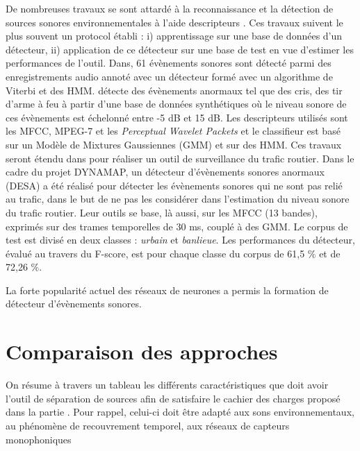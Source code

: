 De nombreuses travaux se sont attardé à la reconnaissance et la détection de sources sonores environnementales à l'aide descripteurs \cite{dufaux2000automatic,defreville_automatic_2006}. Ces travaux suivent le plus souvent un protocol établi : i) apprentissage sur une base de données d'un détecteur, ii) application de ce détecteur sur une base de test en vue d'estimer les performances de l'outil. Dans\cite{mesaros2010acoustic}, 61 évènements sonores sont détecté parmi des enregistrements audio annoté avec un détecteur formé avec un algorithme de Viterbi et des HMM. \cite{ntalampiras2011probabilistic} détecte des évènements anormaux tel que des cris, des tir d'arme à feu à partir d'une base de données synthétiques où le niveau sonore de ces évènements est échelonné entre -5 dB et 15 dB. Les descripteurs utilisés sont les MFCC, MPEG-7 et les \textit{Perceptual Wavelet Packets} et le classifieur est basé sur un Modèle de Mixtures Gaussiennes (GMM) et sur des HMM. Ces travaux seront étendu dans \cite{ntalampiras2014universal} pour réaliser un outil de surveillance du trafic routier. Dans le cadre du projet DYNAMAP, un détecteur d'évènements sonores anormaux (DESA) a été réalisé \cite{socoro2017anomalous} pour détecter les évènements sonores qui ne sont pas relié au trafic, dans le but de ne pas les considérer dans l'estimation du niveau sonore du trafic routier. Leur outils se base, là aussi, sur les MFCC (13 bandes), exprimés sur des trames temporelles de 30 ms, couplé à des GMM. Le corpus de test est divisé en deux classes : \textit{urbain} et \textit{banlieue}. Les performances du détecteur, évalué au travers du F-score, est pour chaque classe du corpus de 61,5 $\%$ et de 72,26 $\%$. 

La forte popularité actuel des réseaux de neurones a permis la formation de détecteur d'évènements sonores\cite{gorin2016dcase, parascandolo2016recurrent}.

\section{Comparaison des approches}

On résume à travers un tableau les différents caractéristiques que doit avoir l'outil de séparation de sources afin de satisfaire le cachier des charges proposé dans la partie \label{}. Pour rappel, celui-ci doit être adapté aux sons environnementaux, au phénomène de recouvrement temporel, aux réseaux de capteurs monophoniques

